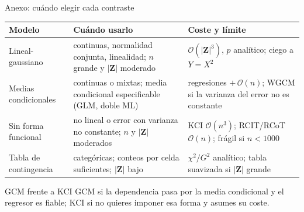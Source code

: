 \documentclass[aspectratio=169,11pt]{beamer}
\begin{document}
\begin{frame}[plain]
\end{frame}

\appendix
\begin{frame}[t]{Anexo: cuándo elegir cada contraste}
  \footnotesize
  \setlength{\tabcolsep}{3pt}
  \renewcommand{\arraystretch}{1.10}
  \begin{tabular}{@{}>{\raggedright\arraybackslash}p{}
                     >{\raggedright\arraybackslash}p{}
                     >{\raggedright\arraybackslash}p{}@{}}
    \toprule
    \textbf{Modelo} & \textbf{Cuándo usarlo} & \textbf{Coste y límite} \\
    \midrule
    Lineal-gaussiano
      & continuas, normalidad conjunta, linealidad; $n$ grande y
        $|\mathbf Z|$ moderado
      & $\mathcal O(|\mathbf Z|^3)$, $p$ analítico; ciego a $Y=X^2$ \\
    \addlinespace
    Medias condicionales
      & continuas o mixtas; media condicional especificable (GLM, doble ML)
      & 2 regresiones $+\,\mathcal O(n)$; WGCM si la varianza del error no es constante \\
    \addlinespace
    Sin forma funcional
      & no lineal o error con varianza no constante; $n$ y $|\mathbf Z|$ moderados
      & KCI $\mathcal O(n^3)$; RCIT/RCoT $\mathcal O(n)$; frágil si $n<1000$ \\
    \addlinespace
    Tabla de contingencia
      & categóricas; conteos por celda suficientes; $|\mathbf Z|$ bajo
      & $\chi^2/G^2$ analítico; tabla suavizada si $|\mathbf Z|$ grande \\
    \bottomrule
  \end{tabular}
  \vspace{0.1cm}
  \begin{alertblock}{GCM frente a KCI}
    GCM si la dependencia pasa por la media condicional y el regresor es
    fiable; KCI si no quieres imponer esa forma y asumes su coste.
  \end{alertblock}
\end{frame}
\end{document}
